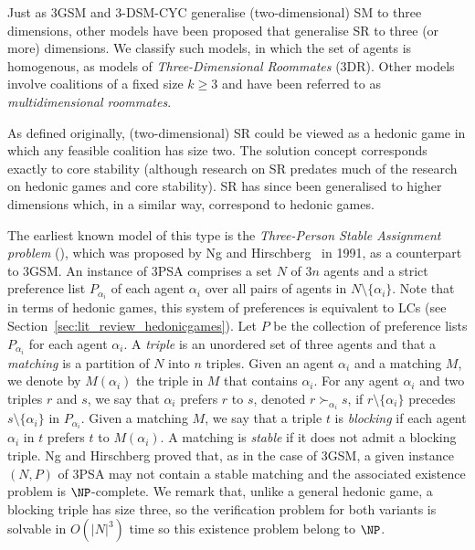 Just as 3GSM and 3-DSM-CYC generalise (two-dimensional) SM to three dimensions, other models have been proposed that generalise SR to three (or more) dimensions. We classify such models, in which the set of agents is homogenous, as models of \emph{Three-Dimensional Roommates} (3DR). Other models involve coalitions of a fixed size $k \geq 3$ and have been referred to as \emph{multidimensional roommates}.

As defined originally, (two-dimensional) SR could be viewed as a hedonic game in which any feasible coalition has size two. The solution concept corresponds exactly to core stability (although research on SR predates much of the research on hedonic games and core stability). SR has since been generalised to higher dimensions which, in a similar way, correspond to hedonic games.

The earliest known model of this type is the \emph{Three-Person Stable Assignment problem} (), which was proposed by Ng and Hirschberg~\cite{NH91} in 1991, as a counterpart to 3GSM. An instance of 3PSA comprises a set $N$ of $3n$ agents and a strict preference list $P_{\alpha_i}$ of each agent $\alpha_i$ over all pairs of agents in $N \setminus \{ \alpha_i \}$. Note that in terms of hedonic games, this system of preferences is equivalent to LCs (see Section~\ref{sec:lit_review_hedonicgames}). Let $P$ be the collection of preference lists  $P_{\alpha_i}$ for each agent $\alpha_i$. A \emph{triple} is an unordered set of three agents and that a \emph{matching} is a partition of $N$ into $n$ triples. Given an agent $\alpha_i$ and a matching $M$, we denote by $M(\alpha_i)$ the triple in $M$ that contains $\alpha_i$. For any agent $\alpha_i$ and two triples $r$ and $s$, we say that $\alpha_i$ prefers $r$ to $s$, denoted $r \succ_{\alpha_i} s$, if $r \setminus \{ \alpha_i \}$ precedes $s \setminus \{ \alpha_i \}$ in $P_{\alpha_i}$. Given a matching $M$, we say that a triple $t$ is \emph{blocking} if each agent $\alpha_i$ in $t$ prefers $t$ to $M(\alpha_i)$. A matching is \emph{stable} if it does not admit a blocking triple. Ng and Hirschberg proved that, as in the case of 3GSM, a given instance $(N, P)$ of 3PSA may not contain a stable matching and the associated existence problem is $\NP$-complete. We remark that, unlike a general hedonic game, a blocking triple has size three, so the verification problem for both variants is solvable in $O(|N|^3)$ time so this existence problem belong to $\NP$.

